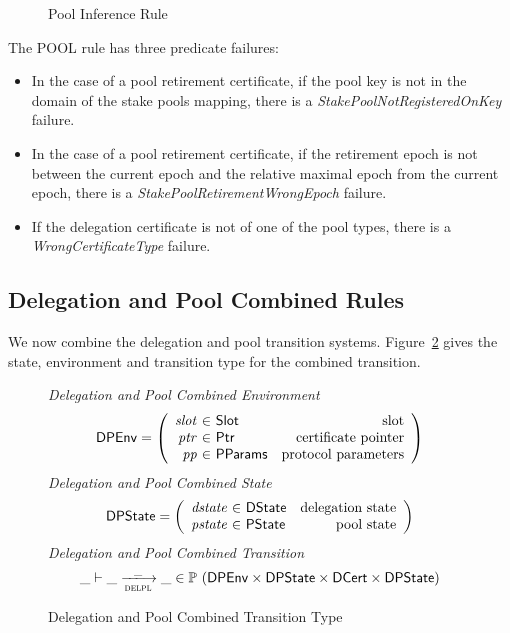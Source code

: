 \begin{figure}[hbt]
  \caption{Pool Inference Rule}
  \label{fig:pool-rules}

\end{figure}

The POOL rule has three predicate failures:
\begin{itemize}
\item In the case of a pool retirement certificate, if the pool key is not in
  the domain of the stake pools mapping, there is a
  {\em StakePoolNotRegisteredOnKey} failure.
\item In the case of a pool retirement certificate, if the retirement epoch is
  not between the current epoch and the relative maximal epoch from the current
  epoch, there is a {\em StakePoolRetirementWrongEpoch} failure.
\item If the delegation certificate is not of one of the pool types, there is a
  {\em WrongCertificateType} failure.
\end{itemize}

\clearpage

\subsection{Delegation and Pool Combined Rules}
\label{sec:del-pool-rules}

We now combine the delegation and pool transition systems.
Figure~\ref{fig:defs:delpl} gives the state, environment and transition type for the
combined transition.

\begin{figure}[hbt]
  \emph{Delegation and Pool Combined Environment}
  \begin{equation*}
    \DPEnv =
    \left(
      \begin{array}{r@{~\in~}lr}
        \var{slot} & \Slot & \text{slot}\\
        \var{ptr} & \Ptr & \text{certificate pointer}\\
        \var{pp} & \PParams & \text{protocol parameters}\\
      \end{array}
    \right)
  \end{equation*}
  \emph{Delegation and Pool Combined State}
  \begin{equation*}
    \DPState =
    \left(
      \begin{array}{r@{~\in~}lr}
        \var{dstate} & \DState & \text{delegation state}\\
        \var{pstate} & \PState & \text{pool state}\\
      \end{array}
    \right)
  \end{equation*}
  \emph{Delegation and Pool Combined Transition}
  \begin{equation*}
    \_ \vdash \_ \trans{delpl}{\_} \_ \in
      \powerset (
        \DPEnv \times \DPState \times \DCert \times \DPState)
  \end{equation*}
  \caption{Delegation and Pool Combined Transition Type}
  \label{fig:defs:delpl}
\end{figure}

